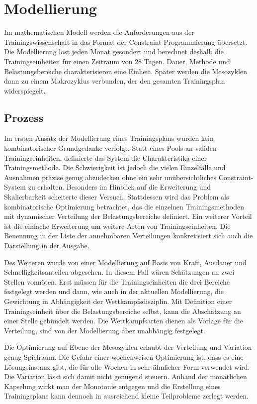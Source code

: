 \chapter{Modellierung}
\label{sec:modellierung}
Im mathematischen Modell werden die Anforderungen aus der Trainingswissenschaft in das Format der Constraint Programmierung übersetzt. Die Modellierung löst jeden Monat gesondert und berechnet deshalb die Trainingseinheiten für einen Zeitraum von 28 Tagen. Dauer, Methode und Belastungsbereiche charakterisieren eine Einheit. Später werden die Mesozyklen dann zu einem Makrozyklus verbunden, der den gesamten Trainingsplan widerspiegelt.

\section{Prozess}
Im ersten Ansatz der Modellierung eines Trainingsplans wurden kein kombinatorischer Grundgedanke verfolgt. Statt eines Pools an validen Trainingseinheiten, definierte das System die Charakteristika einer Trainingsmethode. Die Schwierigkeit ist jedoch die vielen Einzelfälle und Ausnahmen präzise genug abzudecken ohne ein sehr unübersichtliches Constraint-System zu erhalten. Besonders im Hinblick auf die Erweiterung und Skalierbarkeit scheiterte dieser Versuch. Stattdessen wird das Problem als kombinatorische Optimierung betrachtet, das die einzelnen Trainingsmethoden mit dynamischer Verteilung der Belastungsbereiche definiert. Ein weiterer Vorteil ist die einfache Erweiterung um weitere Arten von Trainingseinheiten. Die Benennung in der Liste der annehmbaren Verteilungen konkretisiert sich auch die Darstellung in der Ausgabe. \par
Des Weiteren wurde von einer Modellierung auf Basis von Kraft, Ausdauer und Schnelligkeitsanteilen abgesehen. In diesem Fall wären Schätzungen an zwei Stellen vonnöten. Erst müssen für die Trainingseinheiten die drei Bereiche festgelegt werden und dann, wie auch in der aktuellen Modellierung, die Gewichtung in Abhängigkeit der Wettkampfsdisziplin. Mit Definition einer Trainingseinheit über die Belastungsbereiche selbst, kann die Abschätzung an einer Stelle gebündelt werden. Die Wettkampfsarten dienen als Vorlage für die Verteilung, sind von der Modellierung aber unabhängig festgelegt.\par
Die Optimierung auf Ebene der Mesozyklen erlaubt der Verteilung und Variation genug Spielraum. Die Gefahr einer wochenweisen Optimierung ist, dass es eine Lösungsinstanz gibt, die für alle Wochen in sehr ähnlicher Form verwendet wird. Die Variation lässt sich damit nicht genügend steuern. Anhand der monatlichen Kapselung wirkt man der Monotonie entgegen und die Erstellung eines Trainingsplans kann dennoch in ausreichend kleine Teilprobleme zerlegt werden.

